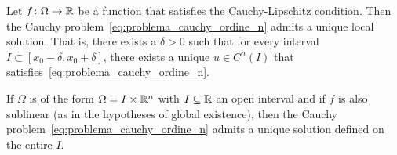 \begin{theorem}
\label{th:cauchy_lipschitz_ordine_n}
%
Let $f\colon \Omega\to {\mathbb R}$ be a function that satisfies the Cauchy-Lipschitz
condition. Then the Cauchy problem~\eqref{eq:problema_cauchy_ordine_n} admits a
unique local solution. That is, there exists a $\delta>0$ such that for every
interval $I\subset [x_0-\delta,x_0+\delta]$, there exists a unique $u\in C^n(I)$
that satisfies~\eqref{eq:problema_cauchy_ordine_n}.

%
If $\Omega$ is of the form $\Omega = I \times {\mathbb R}^n$ with $I\subseteq {\mathbb R}$ an open
interval and if $f$ is also sublinear (as in the hypotheses of global
existence), then the Cauchy problem~\eqref{eq:problema_cauchy_ordine_n} admits a
unique solution defined on the entire $I$.
\end{theorem}
%
